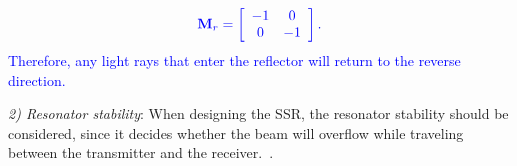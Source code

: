 \documentclass{IEEEtran}
\begin{document}
\begin{equation}
\textcolor{blue}{
\mathbf{M}_r=\left[\begin{array}{cc}
-1 & 0 \\
0 & -1
\end{array}\right].}
\end{equation}
\textcolor{blue}{Therefore, any light rays that enter the reflector will return to the reverse direction.}


\emph{2) Resonator stability}:
When designing the SSR, the resonator stability should be considered, since it decides whether the beam will overflow while traveling between the transmitter and the receiver.~\cite{Hodgson2005Laser}. %
\end{document}
